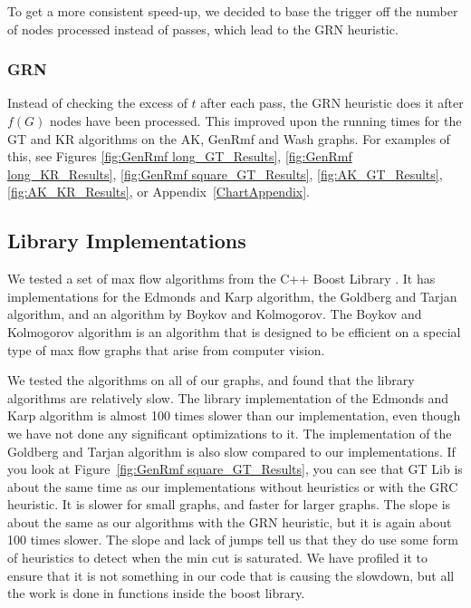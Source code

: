 To get a more consistent speed-up, we decided to base the trigger off the number of nodes processed instead of passes, which lead to the GRN heuristic.

\subsubsection{GRN}

Instead of checking the excess of $t$ after each pass, the GRN heuristic does it after $f(G)$ nodes have been processed.
This improved upon the running times for the GT and KR algorithms on the AK, GenRmf and Wash graphs.
For examples of this, see Figures 
\ref{fig:GenRmf long_GT_Results}, 
\ref{fig:GenRmf long_KR_Results}, 
\ref{fig:GenRmf square_GT_Results}, 
\ref{fig:AK_GT_Results}, 
\ref{fig:AK_KR_Results}, 
or Appendix~\ref{ChartAppendix}.

\subsection{Library Implementations}

We tested a set of max flow algorithms from the C++ Boost Library \cite{BoostLibraries}.
It has implementations for the Edmonds and Karp algorithm, the Goldberg and Tarjan algorithm, and an algorithm by Boykov and Kolmogorov.
The Boykov and Kolmogorov algorithm is an algorithm that is designed to be efficient on a special type of max flow graphs that arise from computer vision.

We tested the algorithms on all of our graphs, and found that the library algorithms are relatively slow.
The library implementation of the Edmonds and Karp algorithm is almost 100 times slower than our implementation, even though we have not done any significant optimizations to it.
The implementation of the Goldberg and Tarjan algorithm is also slow compared to our implementations. 
If you look at Figure~\ref{fig:GenRmf square_GT_Results}, you can see that GT Lib is about the same time as our implementations without heuristics or with the GRC heuristic.
It is slower for small graphs, and faster for larger graphs. The slope is about the same as our algorithms with the GRN heuristic, but it is again about 100 times slower.
The slope and lack of jumps tell us that they do use some form of heuristics to detect when the min cut is saturated.
We have profiled it to ensure that it is not something in our code that is causing the slowdown, but all the work is done in functions inside the boost library.

